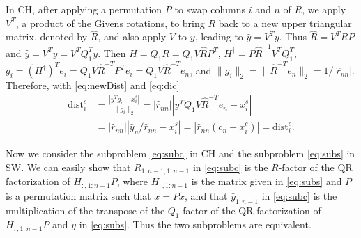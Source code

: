 \documentclass[conference]{IEEEtran}
\newcommand{\dist}{\mathrm{dist}}
\begin{document}

In CH, after applying a permutation $P$ to swap columns $i$ and $n$ of $R$,  
we apply $V^T$, a product of the Givens rotations, to bring $R$ back to a new upper triangular
matrix, denoted by $\hat{R}$, and also apply $V$ to $\bar{y}$, 
leading to  $\hat{y} = V^T\bar{y}$. 
Thus  $\hat{R}=V^T RP$ and $\hat{y} = V^T\bar{y}=V^TQ_1^Ty$. 
Then $H=Q_1R= Q_1V\hat{R}P^T$, $H^\dag= P\hat{R}^{-1}V^TQ_1^T$, 
$g_i=(H^\dag)^Te_i=Q_1V\hat{R}^{-T}P^Te_i=Q_1V\hat{R}^{-T}e_n$,
and $\|g_i\|_2=\|\hat{R}^{-T}e_n\|_2=1/|\hat{r}_{nn}|$.
Therefore, with \eqref{eq:newDist} and \eqref{eq:dic}
\begin{align}
\dist_i^s
&=\frac{ | y^Tg_i - \bar{x}_i^s   |}{  \| g_i   \|_2} 
=|\hat{r}_{nn}||y^TQ_1V\hat{R}^{-T}e_n- \bar{x}_i^s  |  \label{eq:disc} \\
& = |\hat{r}_{nn}|| \hat{y}_n/\hat{r}_{nn} - \bar{x}_i^s | 
 = |\hat{r}_{nn}(c_n-\bar{x}_i^c)| =\dist_i^c.  \nonumber
\end{align}

Now we consider  the subproblem \eqref{eq:subc} in CH and the subproblem \eqref{eq:subs} in SW.
We can easily show that $R_{1:n-1,1:n-1}$ in  \eqref{eq:subc} is the $R$-factor of the QR factorization
of $H_{:,1:n-1}P$, where $H_{:,1:n-1}$ is the matrix given in \eqref{eq:subs}
and $P$ is a permutation matrix such that $\check{x}=P\tilde{x}$,
and that $\bar{y}_{1:n-1}$ in  \eqref{eq:subc} is the multiplication of the transpose of 
the $Q_1$-factor of the QR factorization of $H_{:,1:n-1}P$ and $y$ in \eqref{eq:subs}.
Thus the two subproblems are equivalent. 
\end{document}
